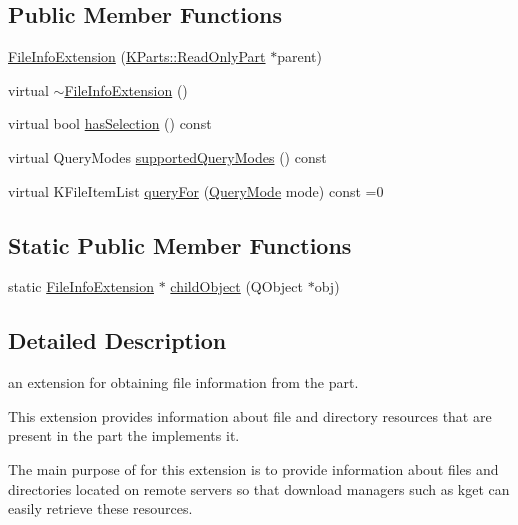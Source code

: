 \subsection*{Public Member Functions}
\begin{DoxyCompactItemize}
\item 
\hyperlink{classKParts_1_1FileInfoExtension_ab7f24a4cbfcabe40422b26fa2ee562b7}{File\+Info\+Extension} (\hyperlink{classKParts_1_1ReadOnlyPart}{K\+Parts\+::\+Read\+Only\+Part} $\ast$parent)
\item 
virtual \hyperlink{classKParts_1_1FileInfoExtension_aefda4c72d82131c2dd8cc2e69d157a90}{$\sim$\+File\+Info\+Extension} ()
\item 
virtual bool \hyperlink{classKParts_1_1FileInfoExtension_a4774dbd7c4debae026e6103ba0b4ffd5}{has\+Selection} () const 
\item 
virtual Query\+Modes \hyperlink{classKParts_1_1FileInfoExtension_aa07ffdbb4c8ecc67d75836d48cb33250}{supported\+Query\+Modes} () const 
\item 
virtual K\+File\+Item\+List \hyperlink{classKParts_1_1FileInfoExtension_addac1579dcbc21c5fcceecda6f5cb532}{query\+For} (\hyperlink{classKParts_1_1FileInfoExtension_a9bc830a53b0005013082984a2bbd5639}{Query\+Mode} mode) const =0
\end{DoxyCompactItemize}
\subsection*{Static Public Member Functions}
\begin{DoxyCompactItemize}
\item 
static \hyperlink{classKParts_1_1FileInfoExtension}{File\+Info\+Extension} $\ast$ \hyperlink{classKParts_1_1FileInfoExtension_a1c137505684c839e52edff6b3592a264}{child\+Object} (Q\+Object $\ast$obj)
\end{DoxyCompactItemize}


\subsection{Detailed Description}
an extension for obtaining file information from the part. 

This extension provides information about file and directory resources that are present in the part the implements it.

The main purpose of for this extension is to provide information about files and directories located on remote servers so that download managers such as kget can easily retrieve these resources.

